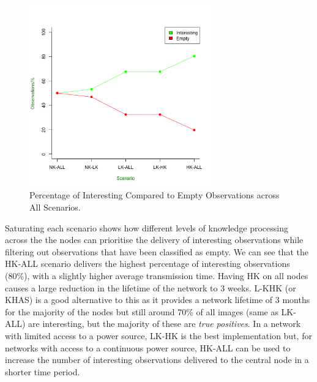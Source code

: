 	\begin{figure}[h]
	\centering
	\includegraphics[width=0.70\textwidth]{Chap7/figures/saturated/int_vs_empty}
	\caption{Percentage of Interesting Compared to Empty Observations across All Scenarios.}
	\label{fig:sat:int:empty}
	\end{figure}

Saturating each scenario shows how different levels of knowledge processing across the the nodes can prioritise the delivery of interesting observations while filtering out observations that have been classified as empty. We can see that the HK-ALL scenario delivers the highest percentage of interesting observations (80\%), with a slightly higher average transmission time. Having HK on all nodes causes a large reduction in the lifetime of the network to 3 weeks. L-KHK (or KHAS) is a good alternative to this as it provides a network lifetime of 3 months for the majority of the nodes but still around 70\% of all images (same as LK-ALL) are interesting, but the majority of these are \textit{true positives}. In a network with limited access to a power source, LK-HK is the best implementation but, for networks with access to a continuous power source, HK-ALL can be used to increase the number of interesting observations delivered to the central node in a shorter time period.



